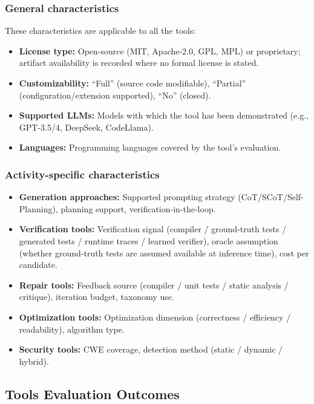\documentclass[10pt,a4paper]{article}
\begin{document}
\subsubsection{General characteristics}
These characteristics are applicable to all the tools:
\begin{itemize}[leftmargin=*]
\item \textbf{License type:} Open-source (MIT, Apache-2.0, GPL, MPL) or proprietary; artifact availability is recorded where no formal license is stated.
\item \textbf{Customizability:} ``Full'' (source code modifiable), ``Partial'' (configuration/extension supported), ``No'' (closed).
\item \textbf{Supported LLMs:} Models with which the tool has been demonstrated (e.g., GPT-3.5/4, DeepSeek, CodeLlama).
\item \textbf{Languages:} Programming languages covered by the tool's evaluation.
\end{itemize}

\subsubsection{Activity-specific characteristics}
\begin{itemize}[leftmargin=*]
\item \textbf{Generation approaches:} Supported prompting strategy (CoT/SCoT/Self-Planning), planning support, verification-in-the-loop.
\item \textbf{Verification tools:} Verification signal (compiler / ground-truth tests / generated tests / runtime traces / learned verifier), oracle assumption (whether ground-truth tests are assumed available at inference time), cost per candidate.
\item \textbf{Repair tools:} Feedback source (compiler / unit tests / static analysis / critique), iteration budget, taxonomy use.
\item \textbf{Optimization tools:} Optimization dimension (correctness / efficiency / readability), algorithm type.
\item \textbf{Security tools:} CWE coverage, detection method (static / dynamic / hybrid).
\end{itemize}

\subsection{Tools Evaluation Outcomes}
\label{sec:comparison}
\end{document}
